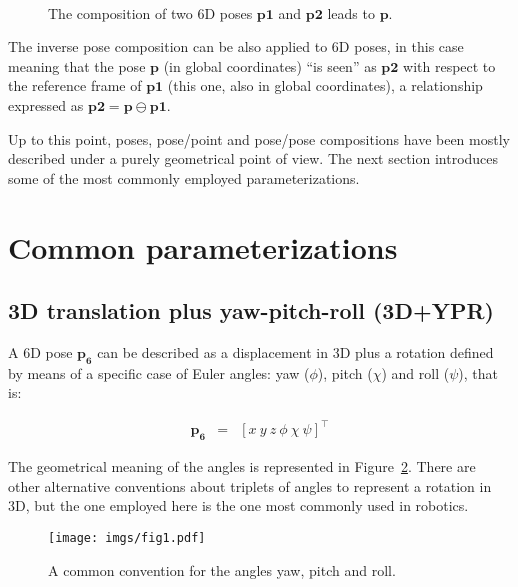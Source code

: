 \documentclass[a4paper,11pt]{report}
\begin{document}
\begin{figure}[h!]
\centering
{}
 \\
\caption{The composition of two 6D poses $\mathbf{p1}$ and $\mathbf{p2}$ leads to $\mathbf{p}$.}
\label{fig:comp_2poses}
\end{figure}

The inverse pose composition can be also applied to 6D poses, in this case meaning that
the pose $\mathbf{p}$ (in global coordinates) ``is seen'' as $\mathbf{p2}$ with respect
to the reference frame of $\mathbf{p1}$ (this one, also in global coordinates), a
relationship expressed as $\mathbf{p2} = \mathbf{p} \ominus \mathbf{p1}$.


Up to this point, poses, pose/point and pose/pose compositions have been mostly described
under a purely geometrical point of view.
The next section introduces some of the most commonly employed parameterizations.


\newpage

\section{Common parameterizations}


\subsection{3D translation plus yaw-pitch-roll (3D+YPR)}

A 6D pose $\mathbf{p_6}$ can be described as a displacement in 3D plus a rotation defined by
means of a specific case of Euler angles: yaw ($\phi$), pitch
($\chi$) and roll ($\psi$), that is:

\begin{eqnarray}
\mathbf{p_6} &=& [x ~ y ~ z ~ \phi ~ \chi ~ \psi]^\top
\end{eqnarray}

The geometrical meaning of the angles is represented in Figure~\ref{fig:ypr}.
There are other alternative conventions about triplets of angles to represent a rotation in 3D, but
the one employed here is the one most commonly used in robotics.

\begin{figure}[h]
\centering
\texttt{[image: imgs/fig1.pdf]}
\caption{A common convention for the angles yaw, pitch and roll.}
\label{fig:ypr}
\end{figure}
\end{document}

